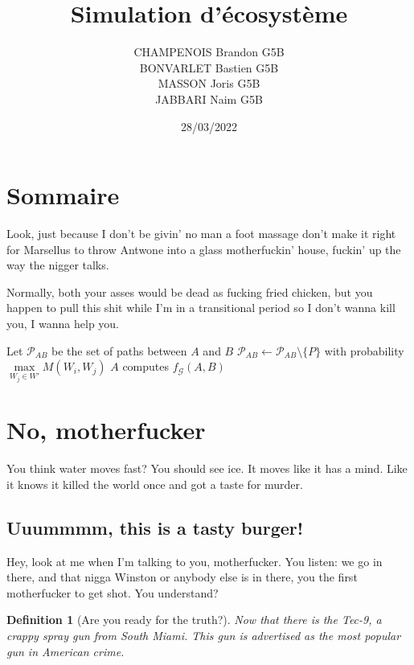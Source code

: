 \documentclass[a4paper, 11pt]{article}
\author{CHAMPENOIS Brandon \textsc{G5B} \\ BONVARLET Bastien \textsc{G5B} \\ MASSON Joris \textsc{G5B} \\ JABBARI Naim \textsc{G5B} }
\title{Simulation d'écosystème}
\date{28/03/2022}
\newtheorem{definition}{Definition}
\begin{document}
\maketitle

\section{Sommaire}

Look, just because I don't be givin' no man a foot massage don't make it right for Marsellus to throw Antwone into a glass motherfuckin' house, fuckin' up the way the nigger talks.

\medskip
Normally, both your asses would be dead as fucking fried chicken, but you happen to pull this shit while I'm in a transitional period so I don't wanna kill you, I wanna help you. 

\begin{algorithm}
 \centering
 \begin{algorithmic}[1]
  \STATE Let $\mathcal{P}_{AB}$ be the set of paths between $A$ and $B$
  \IF{\TRUE}
     \STATE $\mathcal{P}_{AB}\leftarrow \mathcal{P}_{AB}\setminus\{P\}$ with probability $\underset{W_j\in W'}{\max} M(W_i,W_j)$
    \ENDFOR
   \ENDFOR
  \ENDIF
  \STATE $A$ computes $f_\mathcal{G}(A,B)$
 \end{algorithmic}
\end{algorithm}

\section{No, motherfucker}

You think water moves fast? You should see ice. It moves like it has a mind. Like it knows it killed the world once and got a taste for murder.

\subsection{Uuummmm, this is a tasty burger!}
\label{sec::burger}

Hey, look at me when I'm talking to you, motherfucker. You listen: we go in there, and that nigga Winston or anybody else is in there, you the first motherfucker to get shot. You understand?

\begin{definition}[Are you ready for the truth?]
Now that there is the Tec-9, a crappy spray gun from South Miami. This gun is advertised as the most popular gun in American crime.
 \label{def::truth}
\end{definition}
\end{document}
